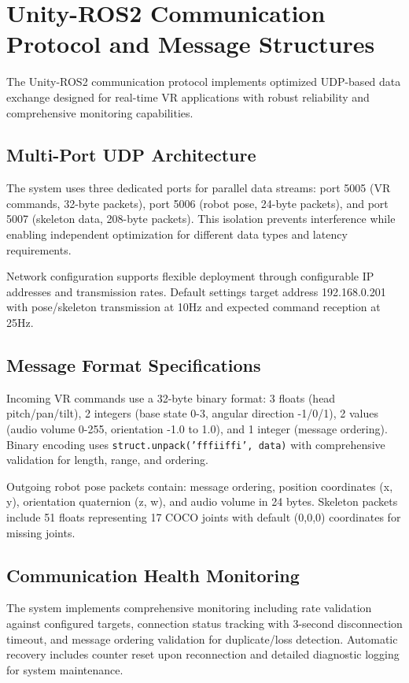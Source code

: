 \section{Unity-ROS2 Communication Protocol and Message Structures}

The Unity-ROS2 communication protocol implements optimized UDP-based data exchange designed for real-time VR applications with robust reliability and comprehensive monitoring capabilities.

\subsection{Multi-Port UDP Architecture}

The system uses three dedicated ports for parallel data streams: port 5005 (VR commands, 32-byte packets), port 5006 (robot pose, 24-byte packets), and port 5007 (skeleton data, 208-byte packets). This isolation prevents interference while enabling independent optimization for different data types and latency requirements.

Network configuration supports flexible deployment through configurable IP addresses and transmission rates. Default settings target address 192.168.0.201 with pose/skeleton transmission at 10Hz and expected command reception at 25Hz.

\subsection{Message Format Specifications}

Incoming VR commands use a 32-byte binary format: 3 floats (head pitch/pan/tilt), 2 integers (base state 0-3, angular direction -1/0/1), 2 values (audio volume 0-255, orientation -1.0 to 1.0), and 1 integer (message ordering). Binary encoding uses \texttt{struct.unpack('fffiiffi', data)} with comprehensive validation for length, range, and ordering.

Outgoing robot pose packets contain: message ordering, position coordinates (x, y), orientation quaternion (z, w), and audio volume in 24 bytes. Skeleton packets include 51 floats representing 17 COCO joints with default (0,0,0) coordinates for missing joints.

\subsection{Communication Health Monitoring}

The system implements comprehensive monitoring including rate validation against configured targets, connection status tracking with 3-second disconnection timeout, and message ordering validation for duplicate/loss detection. Automatic recovery includes counter reset upon reconnection and detailed diagnostic logging for system maintenance.


